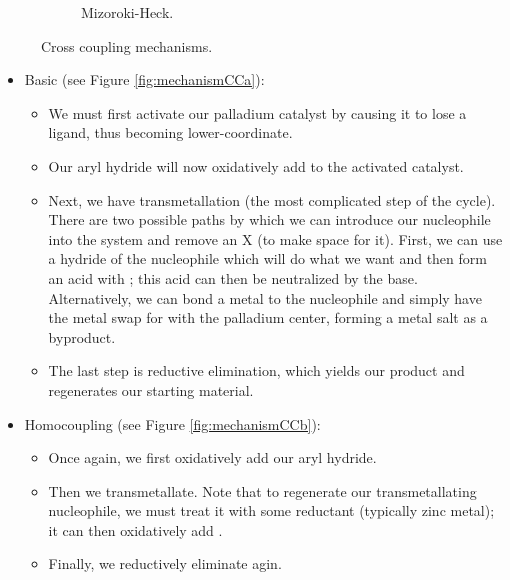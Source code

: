 \documentclass[../notes.tex]{subfiles}
\begin{document}
\begin{itemize}
\begin{figure}[h!]
\begin{subfigure}[b]{0.8\linewidth}
            \caption{Mizoroki-Heck.}
            \label{fig:mechanismCCc}
        \end{subfigure}
        \caption{Cross coupling mechanisms.}
        \label{fig:mechanismCC}
    \end{figure}
    \begin{itemize}
        \item Basic (see Figure \ref{fig:mechanismCCa}):
        \begin{itemize}
            \item We must first activate our palladium catalyst by causing it to lose a ligand, thus becoming lower-coordinate.
            \item Our aryl hydride will now oxidatively add to the activated catalyst.
            \item Next, we have transmetallation (the most complicated step of the cycle). There are two possible paths by which we can introduce our nucleophile into the system and remove an X (to make space for it). First, we can use a hydride of the nucleophile which will do what we want and then form an acid with ; this acid can then be neutralized by the base. Alternatively, we can bond a metal to the nucleophile and simply have the metal swap  for  with the palladium center, forming a metal salt as a byproduct.
            \item The last step is reductive elimination, which yields our product and regenerates our starting material.
        \end{itemize}
        \item Homocoupling (see Figure \ref{fig:mechanismCCb}):
        \begin{itemize}
            \item Once again, we first oxidatively add our aryl hydride.
            \item Then we transmetallate. Note that to regenerate our transmetallating nucleophile, we must treat it with some reductant (typically zinc metal); it can then oxidatively add .
            \item Finally, we reductively eliminate agin.
        \end{itemize}

\end{itemize}
\end{itemize}
\end{document}
